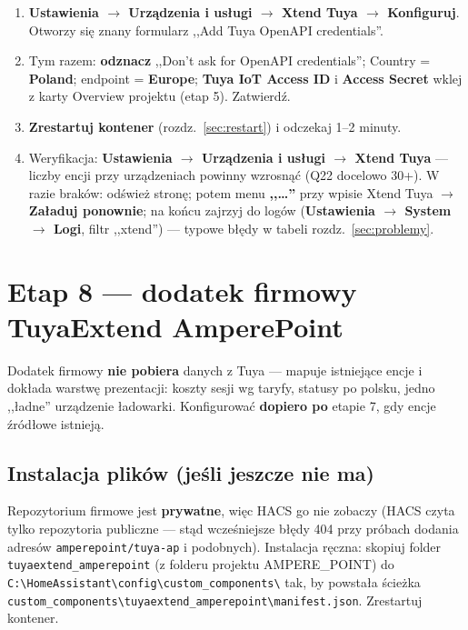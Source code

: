 \documentclass[11pt,a4paper]{article}
\begin{document}
\begin{enumerate}
\item \textbf{Ustawienia $\to$ Urządzenia i usługi $\to$ Xtend Tuya $\to$ Konfiguruj}. Otworzy się znany formularz ,,Add Tuya OpenAPI credentials''.
\item Tym razem: \textbf{odznacz} ,,Don't ask for OpenAPI credentials''; Country = \textbf{Poland}; endpoint = \textbf{Europe}; \textbf{Tuya IoT Access ID} i \textbf{Access Secret} wklej z karty Overview projektu (etap 5). Zatwierdź.
\item \textbf{Zrestartuj kontener} (rozdz.~\ref{sec:restart}) i odczekaj 1--2 minuty.
\item Weryfikacja: \textbf{Ustawienia $\to$ Urządzenia i usługi $\to$ Xtend Tuya} --- liczby encji przy urządzeniach powinny wzrosnąć (Q22 docelowo 30+). W razie braków: odśwież stronę; potem menu \textbf{,,\ldots''} przy wpisie Xtend Tuya $\to$ \textbf{Załaduj ponownie}; na końcu zajrzyj do logów (\textbf{Ustawienia $\to$ System $\to$ Logi}, filtr ,,xtend'') --- typowe błędy w tabeli rozdz.~\ref{sec:problemy}.
\end{enumerate}

\section{Etap 8 --- dodatek firmowy TuyaExtend AmperePoint}
\label{sec:etap8}

Dodatek firmowy \textbf{nie pobiera} danych z Tuya --- mapuje istniejące encje i dokłada warstwę prezentacji: koszty sesji wg taryfy, statusy po polsku, jedno ,,ładne'' urządzenie ładowarki. Konfigurować \textbf{dopiero po} etapie 7, gdy encje źródłowe istnieją.

\subsection{Instalacja plików (jeśli jeszcze nie ma)}

Repozytorium firmowe jest \textbf{prywatne}, więc HACS go nie zobaczy (HACS czyta tylko repozytoria publiczne --- stąd wcześniejsze błędy 404 przy próbach dodania adresów \texttt{amperepoint/tuya-ap} i podobnych). Instalacja ręczna: skopiuj folder \texttt{tuyaextend\_amperepoint} (z folderu projektu AMPERE\_POINT) do \texttt{C:\textbackslash HomeAssistant\textbackslash config\textbackslash custom\_components\textbackslash} tak, by powstała ścieżka \texttt{custom\_components\textbackslash tuyaextend\_amperepoint\textbackslash manifest.json}. Zrestartuj kontener.
\end{document}
